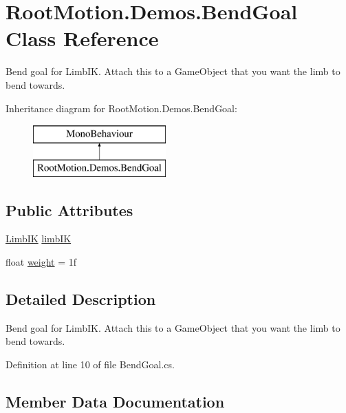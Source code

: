 \hypertarget{class_root_motion_1_1_demos_1_1_bend_goal}{}\section{Root\+Motion.\+Demos.\+Bend\+Goal Class Reference}
\label{class_root_motion_1_1_demos_1_1_bend_goal}


Bend goal for Limb\+IK. Attach this to a Game\+Object that you want the limb to bend towards.  


Inheritance diagram for Root\+Motion.\+Demos.\+Bend\+Goal\+:\begin{figure}[H]
\begin{center}
\leavevmode
\includegraphics[height=2.000000cm]{class_root_motion_1_1_demos_1_1_bend_goal}
\end{center}
\end{figure}
\subsection*{Public Attributes}
\begin{DoxyCompactItemize}
\item 
\mbox{\hyperlink{class_root_motion_1_1_final_i_k_1_1_limb_i_k}{Limb\+IK}} \mbox{\hyperlink{class_root_motion_1_1_demos_1_1_bend_goal_aa417d38899f1e159906b45a8942dfc8a}{limb\+IK}}
\item 
float \mbox{\hyperlink{class_root_motion_1_1_demos_1_1_bend_goal_a4c927a3968fdee885bfb52d09d859c1a}{weight}} = 1f
\end{DoxyCompactItemize}


\subsection{Detailed Description}
Bend goal for Limb\+IK. Attach this to a Game\+Object that you want the limb to bend towards. 



Definition at line 10 of file Bend\+Goal.\+cs.



\subsection{Member Data Documentation}
\mbox{\label{class_root_motion_1_1_demos_1_1_bend_goal_aa417d38899f1e159906b45a8942dfc8a}} 
